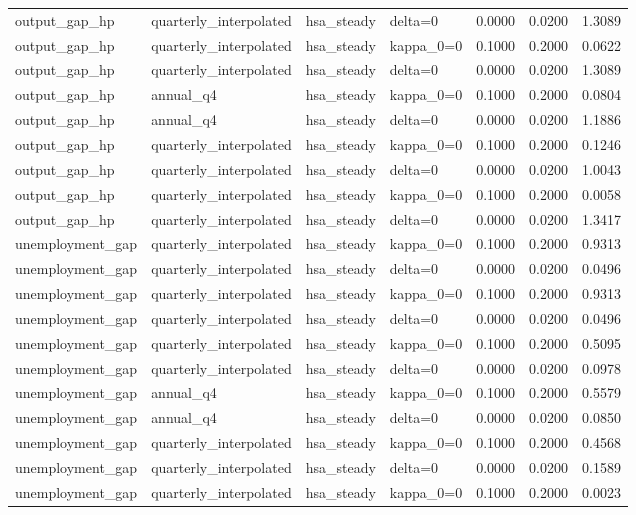 \begin{tabular}{llllrrr}
output\_gap\_hp & quarterly\_interpolated & hsa\_steady & delta=0 & 0.0000 & 0.0200 & 1.3089 \\
output\_gap\_hp & quarterly\_interpolated & hsa\_steady & kappa\_0=0 & 0.1000 & 0.2000 & 0.0622 \\
output\_gap\_hp & quarterly\_interpolated & hsa\_steady & delta=0 & 0.0000 & 0.0200 & 1.3089 \\
output\_gap\_hp & annual\_q4 & hsa\_steady & kappa\_0=0 & 0.1000 & 0.2000 & 0.0804 \\
output\_gap\_hp & annual\_q4 & hsa\_steady & delta=0 & 0.0000 & 0.0200 & 1.1886 \\
output\_gap\_hp & quarterly\_interpolated & hsa\_steady & kappa\_0=0 & 0.1000 & 0.2000 & 0.1246 \\
output\_gap\_hp & quarterly\_interpolated & hsa\_steady & delta=0 & 0.0000 & 0.0200 & 1.0043 \\
output\_gap\_hp & quarterly\_interpolated & hsa\_steady & kappa\_0=0 & 0.1000 & 0.2000 & 0.0058 \\
output\_gap\_hp & quarterly\_interpolated & hsa\_steady & delta=0 & 0.0000 & 0.0200 & 1.3417 \\
unemployment\_gap & quarterly\_interpolated & hsa\_steady & kappa\_0=0 & 0.1000 & 0.2000 & 0.9313 \\
unemployment\_gap & quarterly\_interpolated & hsa\_steady & delta=0 & 0.0000 & 0.0200 & 0.0496 \\
unemployment\_gap & quarterly\_interpolated & hsa\_steady & kappa\_0=0 & 0.1000 & 0.2000 & 0.9313 \\
unemployment\_gap & quarterly\_interpolated & hsa\_steady & delta=0 & 0.0000 & 0.0200 & 0.0496 \\
unemployment\_gap & quarterly\_interpolated & hsa\_steady & kappa\_0=0 & 0.1000 & 0.2000 & 0.5095 \\
unemployment\_gap & quarterly\_interpolated & hsa\_steady & delta=0 & 0.0000 & 0.0200 & 0.0978 \\
unemployment\_gap & annual\_q4 & hsa\_steady & kappa\_0=0 & 0.1000 & 0.2000 & 0.5579 \\
unemployment\_gap & annual\_q4 & hsa\_steady & delta=0 & 0.0000 & 0.0200 & 0.0850 \\
unemployment\_gap & quarterly\_interpolated & hsa\_steady & kappa\_0=0 & 0.1000 & 0.2000 & 0.4568 \\
unemployment\_gap & quarterly\_interpolated & hsa\_steady & delta=0 & 0.0000 & 0.0200 & 0.1589 \\
unemployment\_gap & quarterly\_interpolated & hsa\_steady & kappa\_0=0 & 0.1000 & 0.2000 & 0.0023 \\

\end{tabular}
